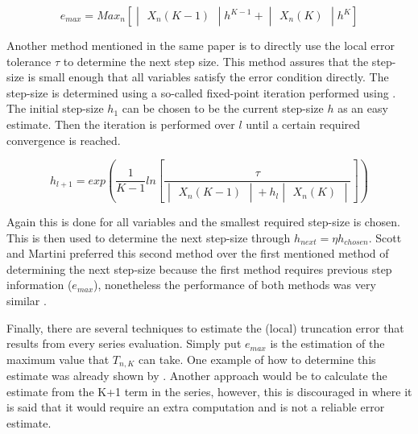 \begin{equation} \label{eq:emax}
e_{max}=Max_{n}\left[\begin{vmatrix}
X_{n}\left(K-1\right)
\end{vmatrix} h^{K-1}+ \begin{vmatrix}
X_{n}\left(K\right)
\end{vmatrix} h^{K}\right]
\end{equation}

Another method mentioned in the same paper is to directly use the local error tolerance $\tau$ to determine the next step size. This method assures that the step-size is small enough that all variables satisfy the error condition directly. The step-size is determined using a so-called fixed-point iteration performed using . The initial step-size $h_{1}$ can be chosen to be the current step-size $h$ as an easy estimate. Then the iteration is performed over $l$ until a certain required convergence is reached.

\begin{equation} \label{eq:fix_point_it}
h_{l+1}=exp\left(\dfrac{1}{K-1}ln\left[\dfrac{\tau}{\begin{vmatrix}
X_{n}\left(K-1\right)
\end{vmatrix}+h_{l}\begin{vmatrix}
X_{n}\left(K\right)
\end{vmatrix}}\right]\right)
\end{equation}

Again this is done for all variables and the smallest required step-size is chosen. This is then used to determine the next step-size through $h_{next}=\eta h_{chosen}$. Scott and Martini preferred this second method over the first mentioned method of determining the next step-size because the first method requires previous step information ($e_{max}$), nonetheless the performance of both methods was very similar \cite{scott2008high}.

Finally, there are several techniques to estimate the (local) truncation error that results from every series evaluation. Simply put $e_{max}$ is the estimation of the maximum value that $T_{n,K}$ can take. One example of how to determine this estimate was already shown by . Another approach would be to calculate the estimate from the K+1 term in the series, however, this is discouraged in \cite{scott2008high} where it is said that it would require an extra computation and is not a reliable error estimate.

